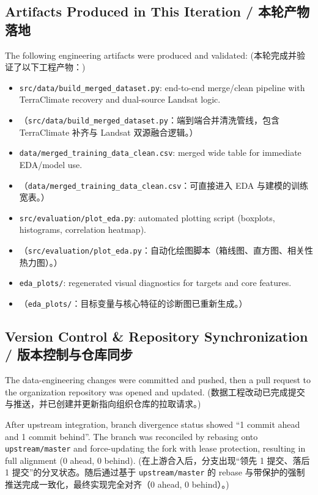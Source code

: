 \subsection{Artifacts Produced in This Iteration / 本轮产物落地}
The following engineering artifacts were produced and validated:
(本轮完成并验证了以下工程产物：)
\begin{itemize}
    \item \texttt{src/data/build\_merged\_dataset.py}: end-to-end merge/clean pipeline with TerraClimate recovery and dual-source Landsat logic.
    \item （\texttt{src/data/build\_merged\_dataset.py}：端到端合并清洗管线，包含 TerraClimate 补齐与 Landsat 双源融合逻辑。）
    \item \texttt{data/merged\_training\_data\_clean.csv}: merged wide table for immediate EDA/model use.
    \item （\texttt{data/merged\_training\_data\_clean.csv}：可直接进入 EDA 与建模的训练宽表。）
    \item \texttt{src/evaluation/plot\_eda.py}: automated plotting script (boxplots, histograms, correlation heatmap).
    \item （\texttt{src/evaluation/plot\_eda.py}：自动化绘图脚本（箱线图、直方图、相关性热力图）。）
    \item \texttt{eda\_plots/}: regenerated visual diagnostics for targets and core features.
    \item （\texttt{eda\_plots/}：目标变量与核心特征的诊断图已重新生成。）
\end{itemize}

\subsection{Version Control \& Repository Synchronization / 版本控制与仓库同步}
The data-engineering changes were committed and pushed, then a pull request to the organization repository was opened and updated.
(数据工程改动已完成提交与推送，并已创建并更新指向组织仓库的拉取请求。)

After upstream integration, branch divergence status showed ``1 commit ahead and 1 commit behind''. The branch was reconciled by rebasing onto \texttt{upstream/master} and force-updating the fork with lease protection, resulting in full alignment (0 ahead, 0 behind).
(在上游合入后，分支出现“领先 1 提交、落后 1 提交”的分叉状态。随后通过基于 \texttt{upstream/master} 的 rebase 与带保护的强制推送完成一致化，最终实现完全对齐（0 ahead, 0 behind）。)

